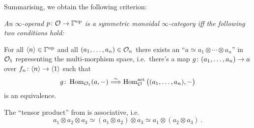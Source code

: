 Summarising, we obtain the following criterion: 
\begin{alphanumerate}
	\item[\itememph{\boxtimes}] \itshape An $\infty$-operad $p\colon \Oo\morphism \IGamma^\op$ is a symmetric monoidal $\infty$-category iff the following two conditions hold:
	\begin{alphanumerate}
		\item For all $\langle n\rangle \in\IGamma^\op$ and all $(a_1,\dotsc,a_n)\in \mathcal{O}_n$ there exists an \enquote{$a\simeq a_1\otimes\dotsb\otimes a_n$} in $\mathcal{O}_1$ representing the multi-morphism space, i.e.\ there's a map $g\colon (a_1,\dotsc,a_n)\morphism a$ over $f_n\colon \langle n\rangle\morphism \langle 1\rangle$ such that
		\begin{equation*}
			g\colon \operatorname{Hom}_{\mathcal{O}_1}(a,-)\overset{\sim}{\Longrightarrow} \operatorname{Hom}_{\mathcal{O}}^\mathrm{act}\big((a_1,\dotsc,a_n),-\big)
		\end{equation*}
		is an equivalence.
		\item The \enquote{tensor product} from  is associative, i.e.
		\begin{equation*}
			a_1\otimes a_2\otimes a_3\simeq (a_1\otimes a_2)\otimes a_3\simeq a_1\otimes (a_2\otimes a_3)\,.
		\end{equation*}
	\end{alphanumerate}
\end{alphanumerate}

